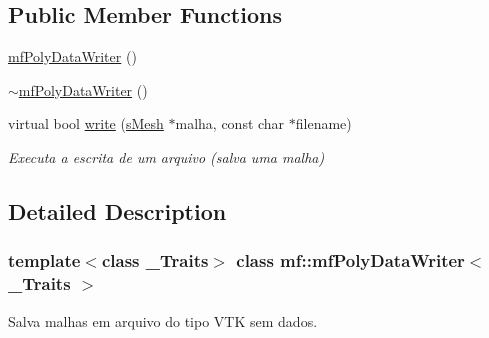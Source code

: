 \subsection*{Public Member Functions}
\begin{DoxyCompactItemize}
\item 
\hyperlink{classmf_1_1mfPolyDataWriter_a6f343089c2533ecc900d613e6ceedbff}{mfPolyDataWriter} ()
\item 
\hyperlink{classmf_1_1mfPolyDataWriter_af0b6e3370b0f9bfdc8c2c44814538742}{$\sim$mfPolyDataWriter} ()
\item 
virtual bool \hyperlink{classmf_1_1mfPolyDataWriter_a5621f62f1a2811fa1b24da447cf3c5ea}{write} (\hyperlink{classmf_1_1mfPolyDataWriter_a4ce58a6aa7139b3d903cc453c4585e6f}{sMesh} $\ast$malha, const char $\ast$filename)
\begin{DoxyCompactList}\small\item\em Executa a escrita de um arquivo (salva uma malha) \item\end{DoxyCompactList}\end{DoxyCompactItemize}


\subsection{Detailed Description}
\subsubsection*{template$<$class \_\-Traits$>$ class mf::mfPolyDataWriter$<$ \_\-Traits $>$}

Salva malhas em arquivo do tipo VTK sem dados. 

